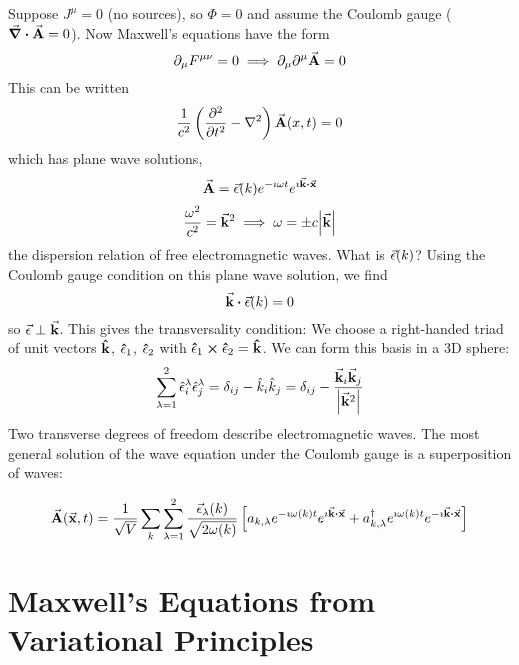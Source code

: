 \documentclass[a4paper,twoside,master.tex]{subfiles}
\begin{document}
Suppose $ J^{\mu} = 0 $ (no sources), so $ \Phi = 0 $ and assume the Coulomb gauge ($ \div{\va{A}} = 0 $). Now Maxwell's equations have the form
\begin{equation}
    \partial_{\mu} F^{\mu \nu} = 0 \implies \partial_{\mu} \partial^{\mu} \va{A} = 0
\end{equation}
This can be written
\begin{equation}
    \frac{1}{c^2} \left( \pdv[2]{t} - \laplacian \right) \va{A}(x, t) = 0
\end{equation}
which has plane wave solutions,
\begin{equation}
    \va{A} = \va{\epsilon}(k) e^{- \imath \omega t} e^{\imath \va{k} \vdot \va{x}}
\end{equation}
\begin{equation}
    \frac{\omega^2}{c^2} = \va{k}^2 \implies \omega = \pm c \abs{\va{k}}
\end{equation}
the dispersion relation of free electromagnetic waves. What is $ \va{\epsilon}(k) $? Using the Coulomb gauge condition on this plane wave solution, we find
\begin{equation}
    \va{k} \vdot \va{\epsilon}(k) = 0
\end{equation}
so $ \va{\epsilon} \perp \va{k} $. This gives the transversality condition: We choose a right-handed triad of unit vectors $ \vu{k} $, $ \vu{\epsilon}_1 $, $ \vu{\epsilon}_2 $ with $ \vu{\epsilon}_1 \cross \vu{\epsilon}_2 = \vu{k} $. We can form this basis in a 3D sphere:
\begin{equation}
    \sum_{\lambda = 1}^{2} \hat{\epsilon}_i^{\lambda} \hat{\epsilon}_j^{\lambda} = \delta_{ij} - \hat{k}_i \hat{k}_j = \delta_{ij} - \frac{\va{k}_i \va{k}_j}{\abs{\va{k}^2}}
\end{equation}
Two transverse degrees of freedom describe electromagnetic waves. The most general solution of the wave equation under the Coulomb gauge is a superposition of waves:

\begin{equation}
    \va{A}(\va{x}, t) = \frac{1}{\sqrt{V}} \sum_k \sum_{\lambda = 1}^2 \frac{\va{\epsilon}_{\lambda}(k)}{\sqrt{2 \omega(k)}} \left[ a_{k, \lambda} e^{- \imath \omega(k) t} e^{\imath \va{k} \vdot \va{x}} + a^\dagger_{k, \lambda} e^{\imath \omega(k) t} e^{- \imath \va{k} \vdot \va{x}} \right]
\end{equation}

\section{Maxwell's Equations from Variational Principles}\label{sec:maxwell's_equations_from_variational_principles}
\end{document}
